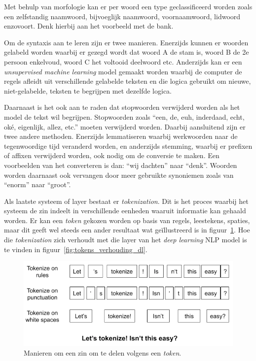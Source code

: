 Met behulp van morfologie kan er per woord een type geclassificeerd worden zoals een zelfstandig naamwoord, bijvoeglijk naamwoord, voornaamwoord, lidwoord enzovoort. Denk hierbij aan het voorbeeld met de bank.

Om de syntaxis aan te leren zijn er twee manieren. Enerzijds kunnen er woorden gelabeld worden waarbij er gezegd wordt dat woord A de stam is, woord B de 2e persoon enkelvoud, woord C het voltooid deelwoord etc. Anderzijds kan er een \textit{unsupervised machine learning} model gemaakt worden waarbij de computer de regels afleidt uit verschillende gelabelde teksten en die logica gebruikt om nieuwe, niet-gelabelde, teksten te begrijpen met dezelfde logica.

Daarnaast is het ook aan te raden dat stopwoorden verwijderd worden als het model de tekst wil begrijpen. Stopwoorden zoals ``een, de, euh, inderdaad, echt, oké, eigenlijk, allez, etc.'' moeten verwijderd worden. Daarbij aansluitend zijn er twee andere methoden. Enerzijds lemmatiseren waarbij  werkwoorden naar de tegenwoordige tijd veranderd worden, en anderzijds stemming, waarbij er prefixen of affixen verwijderd worden, ook nodig om de conversie te maken. Een voorbeelden van het converteren is dan: ``wij dachten'' naar ``denk''. Woorden worden daarnaast ook vervangen door meer gebruikte synoniemen zoals van ``enorm'' naar ``groot''.

Als laatste systeem of layer bestaat er \textit{tokenization}. Dit is het proces waarbij het systeem de zin indeelt in verschillende eenheden waaruit informatie kan gehaald worden.
Er kan een \textit{token} gekozen worden op basis van regels, leestekens, spaties, maar dit geeft wel steeds een ander resultaat wat geïllustreerd is in figuur~\ref{fig:tokens}. Hoe die \textit{tokenization} zich verhoudt met die layer van het \textit{deep learning} NLP model is te vinden in figuur~\ref{fig:tokens_verhouding_dl}.

\begin{figure}
    \centering
    \includegraphics[width=1\textwidth]{./img/tokenize_manier}
    \caption{\label{fig:tokens} Manieren om een zin om te delen volgens een \textit{token}.~\autocite{Horan2020}}
\end{figure}

